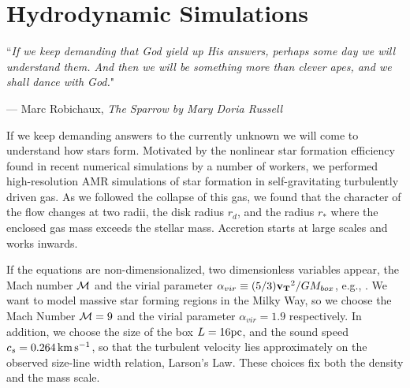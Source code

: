 \documentclass[../dissertation.tex]{subfiles}
\begin{document}
\chapter{Hydrodynamic Simulations}
\label{ch:hydro}

\singlespace
\epigraph{``\emph{If we keep demanding that God yield up His answers, perhaps some day we will understand them. And then we will be something more than clever apes, and we shall dance with God.}"}{--- \textup{Marc Robichaux}, \textit{The Sparrow by Mary Doria Russell}}

\dblspace

%
If we keep demanding answers to the currently unknown we will come to understand how stars form.
Motivated by the nonlinear star formation efficiency found in recent numerical simulations by a number of workers, we performed high-resolution AMR simulations of star formation in self-gravitating turbulently driven gas. 
As we followed the collapse of this gas, we found that the character of the flow changes at two radii, the disk radius $r_d$, and the radius $r_*$ where the enclosed gas mass exceeds the stellar mass. 
Accretion starts at large scales and works inwards. 

If the equations are non-dimensionalized, two dimensionless variables appear, the Mach number ${\cal M}$ and the virial parameter $\alpha_{vir} \equiv (5/3) \mathbf{v_T}^2 / GM_{box}$, e.g., \citet{1984oup..book.....M}.
We want to model massive star forming regions in the Milky Way, so we choose the Mach Number ${\cal M} = 9$ and the virial parameter $\alpha_{vir} = 1.9$ respectively.
In addition, we choose the size of the box $L = 16 \rm pc$, and the sound speed $c_s = 0.264\,{\rm km\,s^{-1}}$, so that the turbulent velocity lies approximately on the observed size-line width relation, Larson's Law.
These choices fix both the density and the mass scale.
\end{document}
